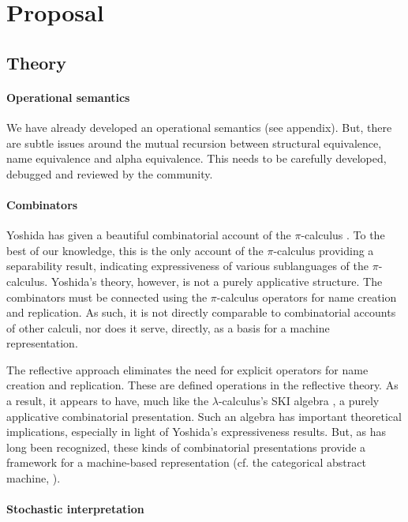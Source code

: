 \documentclass[]{amsart}
\theoremstyle{definition}
\theoremstyle{remark}
\numberwithin{equation}{subsection}
\newcommand{\pic}{$\pi$-calculus}
\begin{document}
\section{Proposal}

\subsection{Theory}

\paragraph{Operational semantics} 

We have already developed an operational semantics (see
appendix). But, there are subtle issues around the mutual recursion
between structural equivalence, name equivalence and alpha
equivalence. This needs to be carefully developed, debugged and
reviewed by the community.

\paragraph{Combinators} 

Yoshida has given a beautiful combinatorial account of the {\pic}
\cite{YoshidaGraphCombinators}. To the best of our knowledge, this is
the only account of the {\pic} providing a separability result,
indicating expressiveness of various sublanguages of the
{\pic}. Yoshida's theory, however, is not a purely applicative
structure. The combinators must be connected using the {\pic}
operators for name creation and replication. As such, it is not
directly comparable to combinatorial accounts of other calculi, nor
does it serve, directly, as a basis for a machine representation.

The reflective approach eliminates the need for explicit operators for
name creation and replication. These are defined operations in the
reflective theory. As a result, it appears to have, much like the
{$\lambda$-calculus}'s \textsf{SKI} algebra \cite{BarendregtLambda}, a
purely applicative combinatorial presentation. Such an algebra has
important theoretical implications, especially in light of Yoshida's
expressiveness results. But, as has long been recognized, these kinds
of combinatorial presentations provide a framework for a machine-based
representation (cf. the categorical abstract machine,
\cite{CousineauCurienCAM}).

\paragraph{Stochastic interpretation} 
\end{document}
